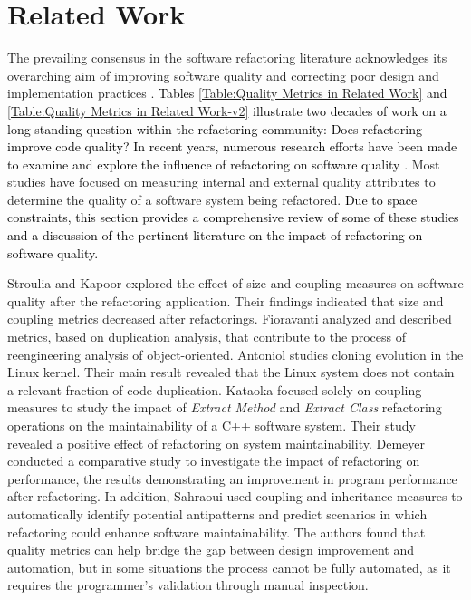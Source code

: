 \section{Related Work}
\label{Section:Background}

% 

The prevailing consensus in the software refactoring literature acknowledges its overarching aim of improving software quality and correcting poor design and implementation practices \citep{Fowler:1999:RID:311424}. \textcolor{black}{\textcolor{black}{Tables \ref{Table:Quality Metrics in Related Work} and \ref{Table:Quality Metrics in Related Work-v2}} illustrate two decades of work on a long-standing question within the refactoring community: Does refactoring improve code quality? In recent years, numerous research efforts have been made to examine and explore the influence of refactoring on software quality} \citep{moser2007case,wilking2007empirical,alshayeb2009empirical, shatnawi2011empirical,bavota2015experimental, chavez2017does,mkaouer2017robust, cedrim2016does,hegedHus2010effect}. 
Most studies have focused on measuring internal and external quality attributes to determine the quality of a software system being refactored. \textcolor{black}{Due to space constraints, this section provides a comprehensive review of some of these studies and a discussion of the pertinent literature on the impact of refactoring on software quality.}

 
Stroulia and Kapoor \citep{stroulia2001metrics} explored the effect of size and coupling measures on software quality after the refactoring application. Their findings indicated that size and coupling metrics decreased after refactorings. Fioravanti \etal \citep{fioravanti2001reengineering} analyzed and described metrics, based on duplication analysis, that
contribute to the process of reengineering analysis of
object-oriented. Antoniol \etal \citep{antoniol2002analyzing} studies cloning evolution in the Linux kernel. Their main result revealed that the Linux system does not contain a relevant fraction of code
duplication.  Kataoka \etal \citep{kataoka2002quantitative} focused solely on coupling measures to study the impact of \textit{Extract Method} and \textit{Extract Class} refactoring operations on the maintainability of a C++ software system. Their study revealed a positive effect of refactoring on system maintainability. Demeyer \citep{demeyer2002maintainability} conducted a comparative study to investigate the impact of refactoring on performance, the results demonstrating an improvement in program performance after refactoring. In addition, Sahraoui \etal \citep{sahraoui2000can} used coupling and inheritance measures to automatically identify potential antipatterns and predict scenarios in which refactoring could enhance software maintainability. The authors found that quality metrics can help bridge the gap between design improvement and automation, but in some situations the process cannot be fully automated, as it requires the programmer's validation through manual inspection. 

